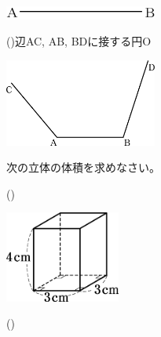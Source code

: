 \documentclass[
  12pt,a4paper,lualatex,ja=standard]{bxjsarticle}
\begin{document}
\begin{flushleft}
\vspace{30mm}

\begin{center}
\def\@captype{figure}
\includegraphics[width=50mm]{media/image11.png}

\end{center}

()\hspace{2.5pt}辺AC, AB, BDに接する円O

\vspace{15mm}

\begin{center}
\def\@captype{figure}
\includegraphics[width=50mm]{media/image191.png}

\end{center}

\newpage

\setcounter{skaunta}{0}
\noindent{} \hspace{1pt}次の立体の体積を求めなさい。

\begin{multicols}{3}

()\hspace{2.5pt}

\begin{center}
\def\@captype{figure}
\includegraphics[height=30mm]{img/img7.jpg}

\end{center}

\columnbreak

()\hspace{2.5pt}


\end{multicols}
\end{flushleft}
\end{document}
